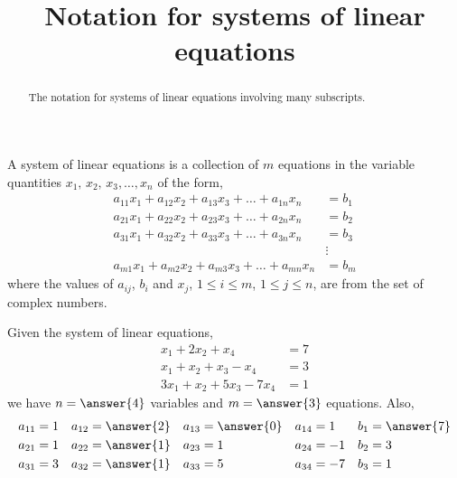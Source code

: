 \documentclass{ximera}
\title{Notation for systems of linear equations}
\begin{document}
\begin{abstract}
  The notation for systems of linear equations involving many subscripts.
\end{abstract}
\maketitle

A system of linear equations is a collection of $m$ equations in the variable quantities $x_1,\,x_2,\,x_3,\ldots,x_n$ of the form,
\begin{align*}
a_{11}x_1+a_{12}x_2+a_{13}x_3+\dots+a_{1n}x_n&=b_1\\
a_{21}x_1+a_{22}x_2+a_{23}x_3+\dots+a_{2n}x_n&=b_2\\
a_{31}x_1+a_{32}x_2+a_{33}x_3+\dots+a_{3n}x_n&=b_3\\
&\vdots\\
a_{m1}x_1+a_{m2}x_2+a_{m3}x_3+\dots+a_{mn}x_n&=b_m
\end{align*}
where the values of $a_{ij}$, $b_i$ and $x_j$, $1\leq i\leq m$, $1\leq j\leq n$, are from the set of complex numbers.

\begin{example}
Given the system of linear equations,
\begin{align*}
x_1+2x_2 + x_4&= 7\\
x_1+x_2+x_3-x_4&=3\\
3x_1+x_2+5x_3-7x_4&=1
\end{align*}
we have $n=\answer{4}$ variables and $m=\answer{3}$ equations.  Also,
\begin{align*}
a_{11}&=1 & a_{12}&=\answer{2} & a_{13}&=\answer{0} & a_{14}&=1 & b_{1}&=\answer{7}\\
a_{21}&=1 & a_{22}&=\answer{1} & a_{23}&=1 & a_{24}&=-1 & b_{2}&=3\\
a_{31}&=3 & a_{32}&=\answer{1} & a_{33}&=5 & a_{34}&=-7 & b_{3}&=1
\end{align*}
\end{example}
\end{document}
